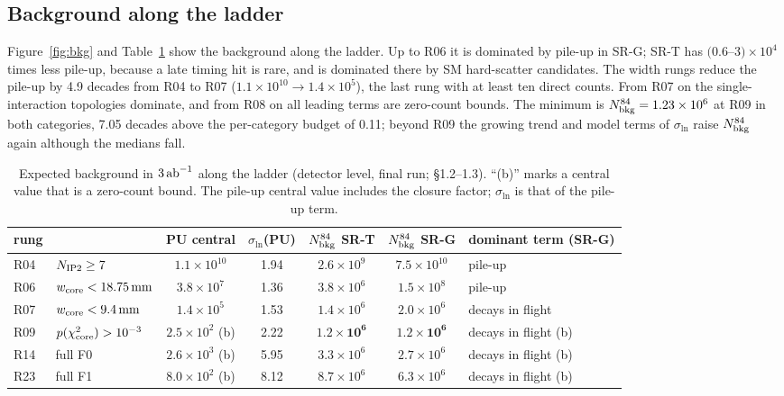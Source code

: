 \subsection{Background along the ladder}\label{sec:bkg:ladder}
Figure~\ref{fig:bkg} and Table~\ref{tab:bkg} show the background along the ladder. Up to R06 it is dominated by
pile-up in SR-G; SR-T has $(0.6$--$3)\times10^4$ times less pile-up, because a late timing hit is rare, and is
dominated there by SM hard-scatter candidates. The width rungs reduce the pile-up by 4.9 decades from R04 to R07
($1.1\times10^{10}\to1.4\times10^5$), the last rung with at least ten direct counts. From R07 on the single-interaction
topologies dominate, and from R08 on all leading terms are zero-count bounds. The minimum is
$N_{\rm bkg}^{84}=1.23\times10^6$ at R09 in both categories, 7.05 decades above the per-category budget of 0.11; beyond
R09 the growing trend and model terms of $\sigma_{\ln}$ raise $N_{\rm bkg}^{84}$ again although the medians fall.

\begin{table}[htbp]
\centering
\small
\caption{Expected background in $3\,\mathrm{ab}^{-1}$ along the ladder (detector level, final run;
 \S1.2--1.3). ``(b)'' marks a central value that is a zero-count bound. The
pile-up central value includes the closure factor; $\sigma_{\ln}$ is that of the pile-up term.}
\label{tab:bkg}
\begin{tabular}{llccccl}
\toprule
rung & & PU central & $\sigma_{\ln}$(PU) & $N_{\rm bkg}^{84}$ SR-T & $N_{\rm bkg}^{84}$ SR-G & dominant term (SR-G)\\
\midrule
R04 & $N_{\rm IP2}\ge7$ & $1.1\times10^{10}$ & 1.94 & $2.6\times10^9$ & $7.5\times10^{10}$ & pile-up\\
R06 & $w_{\rm core}<18.75\,\mathrm{mm}$ & $3.8\times10^{7}$ & 1.36 & $3.8\times10^6$ & $1.5\times10^{8}$ & pile-up\\
R07 & $w_{\rm core}<9.4\,\mathrm{mm}$ & $1.4\times10^{5}$ & 1.53 & $1.4\times10^6$ & $2.0\times10^{6}$ & decays in flight\\
R09 & $p(\chi^2_{\rm core})>10^{-3}$ & $2.5\times10^{2}$ (b) & 2.22 & $\mathbf{1.2\times10^6}$ & $\mathbf{1.2\times10^{6}}$ & decays in flight (b)\\
R14 & full F0 & $2.6\times10^{3}$ (b) & 5.95 & $3.3\times10^6$ & $2.7\times10^{6}$ & decays in flight (b)\\
R23 & full F1 & $8.0\times10^{2}$ (b) & 8.12 & $8.7\times10^6$ & $6.3\times10^{6}$ & decays in flight (b)\\
\bottomrule
\end{tabular}
\end{table}

